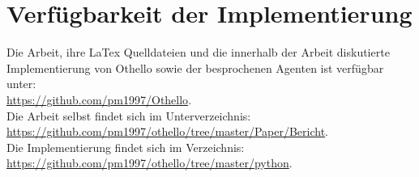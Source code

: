 \chapter*{Verfügbarkeit der Implementierung}
Die Arbeit, ihre LaTex Quelldateien und die innerhalb der Arbeit diskutierte Implementierung von Othello sowie der besprochenen Agenten ist verfügbar unter: 
\\\href{https://github.com/pm1997/Othello}{https://github.com/pm1997/Othello}.
\\Die Arbeit selbst findet sich im Unterverzeichnis:
\\\href{https://github.com/pm1997/othello/tree/master/Paper/Bericht}{https://github.com/pm1997/othello/tree/master/Paper/Bericht}.
\\Die Implementierung findet sich im Verzeichnis:
\\\href{https://github.com/pm1997/othello/tree/master/python}{https://github.com/pm1997/othello/tree/master/python}.
